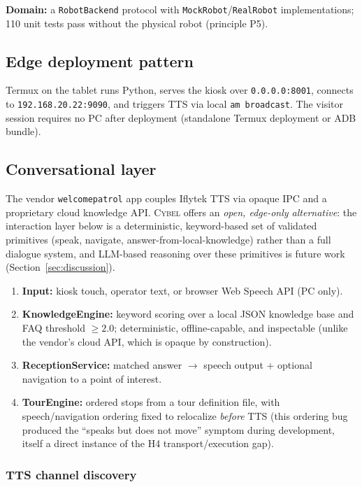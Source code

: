 \documentclass[conference]{IEEEtran}
\newcommand{\cybel}{\textsc{Cybel}}
\begin{document}
\textbf{Domain:} a \texttt{RobotBackend} protocol with \texttt{MockRobot}/\texttt{RealRobot} implementations; 110 unit tests pass without the physical robot (principle P5).

\subsection{Edge deployment pattern}

Termux on the tablet runs Python, serves the kiosk over \texttt{0.0.0.0:8001}, connects to \texttt{192.168.20.22:9090}, and triggers TTS via local \texttt{am broadcast}.
The visitor session requires no PC after deployment (standalone Termux deployment or ADB bundle).

\subsection{Conversational layer}
\label{sec:conv}

The vendor \texttt{welcomepatrol} app couples Iflytek TTS via opaque IPC and a proprietary cloud knowledge API. \cybel{} offers an \emph{open, edge-only alternative}: the interaction layer below is a deterministic, keyword-based set of validated primitives (speak, navigate, answer-from-local-knowledge) rather than a full dialogue system, and LLM-based reasoning over these primitives is future work (Section~\ref{sec:discussion}).

\begin{enumerate}[leftmargin=1.2em]
\item \textbf{Input:} kiosk touch, operator text, or browser Web Speech API (PC only).
\item \textbf{KnowledgeEngine:} keyword scoring over a local JSON knowledge base and FAQ threshold ${\geq}2.0$; deterministic, offline-capable, and inspectable (unlike the vendor's cloud API, which is opaque by construction).
\item \textbf{ReceptionService:} matched answer $\rightarrow$ speech output + optional navigation to a point of interest.
\item \textbf{TourEngine:} ordered stops from a tour definition file, with speech/navigation ordering fixed to relocalize \emph{before} TTS (this ordering bug produced the ``speaks but does not move'' symptom during development, itself a direct instance of the H4 transport/execution gap).
\end{enumerate}

\subsubsection{TTS channel discovery}
\end{document}
